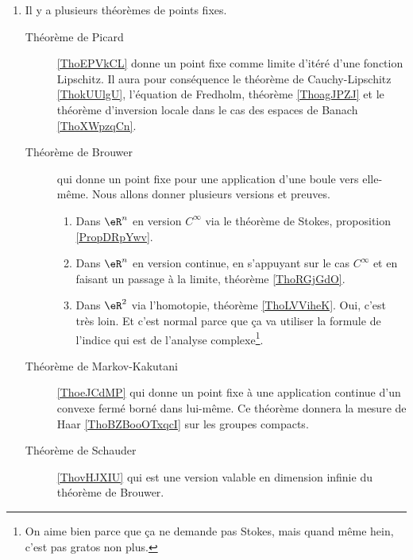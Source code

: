    \begin{enumerate}
\item 
    Il y a plusieurs théorèmes de points fixes.
    \begin{description}
        \item[Théorème de Picard] \ref{ThoEPVkCL} donne un point fixe comme limite d'itéré d'une fonction Lipschitz. Il aura pour conséquence le théorème de Cauchy-Lipschitz \ref{ThokUUlgU}, l'équation de Fredholm, théorème \ref{ThoagJPZJ} et le théorème d'inversion locale dans le cas des espaces de Banach \ref{ThoXWpzqCn}.
    \item[Théorème de Brouwer] qui donne un point fixe pour une application d'une boule vers elle-même. Nous allons donner plusieurs versions et preuves.
            \begin{enumerate}
                \item
                    Dans \( \eR^n\) en version \( C^{\infty}\) via le théorème de Stokes, proposition \ref{PropDRpYwv}.
                \item
                    Dans \( \eR^n\) en version continue, en s'appuyant sur le cas \( C^{\infty}\) et en faisant un passage à la limite, théorème \ref{ThoRGjGdO}.
                \item
                    Dans \( \eR^2\) via l'homotopie, théorème \ref{ThoLVViheK}. Oui, c'est très loin. Et c'est normal parce que ça va utiliser la formule de l'indice qui est de l'analyse complexe\footnote{On aime bien parce que ça ne demande pas Stokes, mais quand même hein, c'est pas gratos non plus.}.
            \end{enumerate}
        \item[Théorème de Markov-Kakutani]\ref{ThoeJCdMP} qui donne un point fixe à une application continue d'un convexe fermé borné dans lui-même. Ce théorème donnera la mesure de Haar \ref{ThoBZBooOTxqcI} sur les groupes compacts.
        \item[Théorème de Schauder] \ref{ThovHJXIU} qui est une version valable en dimension infinie du théorème de Brouwer. 
    \end{description}


\end{enumerate}
